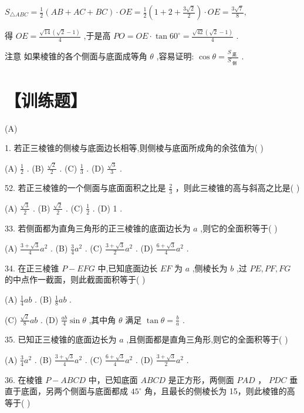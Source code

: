 \documentclass[10pt]{article}
\begin{document}
\({S}_{\bigtriangleup {ABC}} = \frac{1}{2}\left( {{AB} + {AC} + {BC}}\right)  \cdot  {OE} = \frac{1}{2}\left( {1 + 2 + \frac{3\sqrt{2}}{2}}\right)  \cdot  {OE} = \frac{3\sqrt{7}}{8},\)

得 \({OE} = \frac{\sqrt{14}\left( {\sqrt{2} - 1}\right) }{4}\) ,于是高 \({PO} = {OE} \cdot  \tan {60}^{ \circ  } = \frac{\sqrt{42}\left( {\sqrt{2} - 1}\right) }{4}\) .

注意 如果棱锥的各个侧面与底面成等角 \(\theta\) ,容易证明: \(\cos \theta  = \frac{{S}_{\text{ 底 }}}{{S}_{\text{ 侧 }}}\) .

\section*{【训练题】}

(A)

1. 若正三棱锥的侧棱与底面边长相等,则侧棱与底面所成角的余弦值为( )

(A) \(\frac{1}{2}\) . (B) \(\frac{\sqrt{2}}{2}\) . (C) \(\frac{1}{3}\) . (D) \(\frac{\sqrt{3}}{3}\) .

52. 若正三棱锥的一个侧面与底面面积之比是 \(\frac{2}{3}\) ，则此三棱锥的高与斜高之比是( )

(A) \(\frac{\sqrt{3}}{2}\) . (B) \(\frac{\sqrt{2}}{2}\) . (C) \(\frac{1}{2}\) . (D) 1 .

33. 若侧面都为直角三角形的正三棱锥的底面边长为 \(a\) ,则它的全面积等于( )

(A) \(\frac{3 + \sqrt{3}}{4}{a}^{2}\) . (B) \(\frac{3}{4}{a}^{2}\) . (C) \(\frac{3 + \sqrt{3}}{2}{a}^{2}\) . (D) \(\frac{6 + \sqrt{3}}{4}{a}^{2}\) .

34. 在正三棱锥 \(P - {EFG}\) 中,已知底面边长 \({EF}\) 为 \(a\) ,侧棱长为 \(b\) ,过 \({PE},{PF},{FG}\) 的中点作一截面，则此截面面积等于( )

(A) \(\frac{1}{4}{ab}\) . (B) \(\frac{1}{8}{ab}\) .

(C) \(\frac{\sqrt{2}}{8}{ab}\) . (D) \(\frac{ab}{4}\sin \theta\) ,其中角 \(\theta\) 满足 \(\tan \theta  = \frac{b}{a}\) .

35. 已知正三棱锥的底面边长为 \(a\) ,且侧面都是直角三角形,则它的全面积等于( )

(A) \(\frac{3}{4}{a}^{2}\) . (B) \(\frac{3 + \sqrt{3}}{4}{a}^{2}\) . (C) \(\frac{6 + \sqrt{3}}{4}{a}^{2}\) . (D) \(\frac{3 + \sqrt{3}}{2}{a}^{2}\) .

36. 在棱锥 \(P - {ABCD}\) 中，已知底面 \({ABCD}\) 是正方形，两侧面 \({PAD}\) ， \({PDC}\) 垂直于底面，另两个侧面与底面都成 \({45}^{ \circ  }\) 角，且最长的侧棱长为 15，则此棱锥的高等于( )
\end{document}
